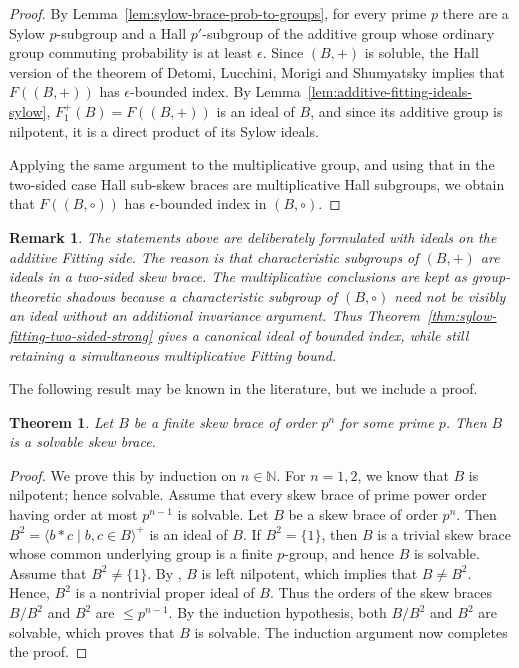 \documentclass[11pt, oneside]{amsart}
\numberwithin{equation}{section}
\theoremstyle{plain}
\newtheorem{rem}[equation]{Remark}
\newtheorem{thm}[equation]{Theorem}
\theoremstyle{definition}
\begin{document}
\begin{proof}
By Lemma~\ref{lem:sylow-brace-prob-to-groups}, for every prime $p$ there
are a Sylow $p$-subgroup and a Hall $p'$-subgroup of the additive group
whose ordinary group commuting probability is at least $\epsilon$. Since
$(B,+)$ is soluble, the Hall version of the theorem of Detomi, Lucchini,
Morigi and Shumyatsky \cite{DLMS25} implies that $F((B,+))$ has
$\epsilon$-bounded index. By Lemma~\ref{lem:additive-fitting-ideals-sylow},
$F^+_1(B)=F((B,+))$ is an ideal of $B$, and since its additive group is
nilpotent, it is a direct product of its Sylow ideals.

Applying the same argument to the multiplicative group, and using that in
the two-sided case Hall sub-skew braces are multiplicative Hall subgroups,
we obtain that $F((B,\circ))$ has $\epsilon$-bounded index in
$(B,\circ)$.
\end{proof}

\begin{rem}
The statements above are deliberately formulated with ideals on the
additive Fitting side. The reason is that characteristic subgroups of
$(B,+)$ are ideals in a two-sided skew brace. The multiplicative conclusions
are kept as group-theoretic shadows because a characteristic subgroup of
$(B,\circ)$ need not be visibly an ideal without an additional invariance
argument. Thus Theorem~\ref{thm:sylow-fitting-two-sided-strong} gives a
canonical ideal of bounded index, while still retaining a simultaneous
multiplicative Fitting bound.
\end{rem}

The following result may be known in the literature, but we include a proof.

\begin{thm}\label{p^n is solvable}
    Let $B$ be a finite skew brace of order $p^n$ for some prime $p$. Then $B$ is a solvable skew brace.
\end{thm}
\begin{proof}
    We prove this by induction on $n\in \mathbb{N}$. For $n=1,2$, we know that $B$ is nilpotent; hence solvable. Assume that every skew brace  of prime power order having order at most $p^{n-1}$ is solvable.  Let $B$ be a skew brace of order $p^n$. Then $B^2=\langle b\ast c \mid b,c\in B\rangle^+$ is an ideal of $B$.
    If $B^2=\{1\}$, then $B$ is a trivial skew brace whose common underlying group is a finite $p$-group, and hence $B$ is solvable. Assume that $B^2 \neq \{1\}$. By \cite[Proposition 4.4.]{CSV19}, $B$ is left nilpotent, which implies that $B\neq B^2$. Hence,  $B^2$ is a nontrivial proper ideal of $B$. Thus the orders of the skew braces $B/B^2$ and $B^2$ are $\leqslant p^{n-1}$. By the induction hypothesis, both $B/B^2$ and $B^2$ are solvable, which proves that $B$ is  solvable. The induction argument now completes the proof.
\end{proof}
\end{document}
